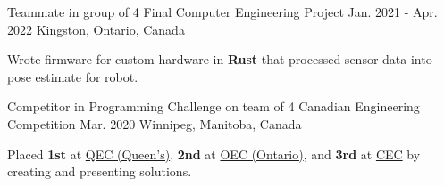
\begin{cventries}

  \cventry
    {Teammate in group of 4} %
    {Final Computer Engineering Project} %
    {Jan. 2021 - Apr. 2022} %
    {Kingston, Ontario, Canada} %
    {
      \begin{cvitems} %
        \item{Wrote firmware for custom hardware in \textbf{Rust} that processed sensor data into pose estimate for robot.}
      \end{cvitems}
    }

  \cventry
    {Competitor in Programming Challenge on team of 4} %
    {Canadian Engineering Competition} %
    {Mar. 2020} %
    {Winnipeg, Manitoba, Canada} %
    {
      \begin{cvitems} %
        \item{Placed \textbf{1st} at \href{https://quengcomp.ca/}{QEC (Queen's)}, \textbf{2nd} at \href{https://www.oec2020.ca/}{OEC (Ontario)}, and \textbf{3rd} at \href{https://cfes.ca/cec/}{CEC} by creating and presenting solutions.} %
      \end{cvitems}
    }


\end{cventries}
